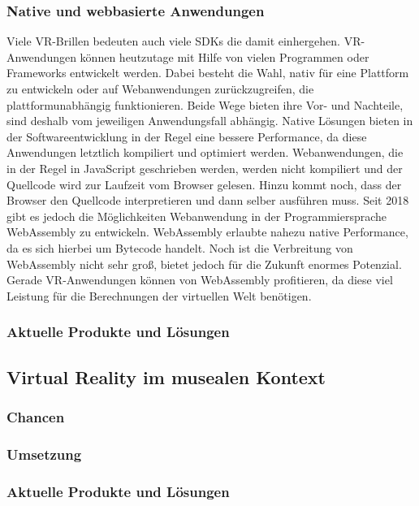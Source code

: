 \documentclass[a4paper,12pt,oneside]{article}
\begin{document}
      \subsubsection{Native und webbasierte Anwendungen}
        Viele VR-Brillen bedeuten auch viele SDKs die damit einhergehen. VR-Anwendungen
        können heutzutage mit Hilfe von vielen Programmen oder Frameworks entwickelt
        werden. Dabei besteht die Wahl, nativ für eine Plattform zu entwickeln oder auf
        Webanwendungen zurückzugreifen, die plattformunabhängig funktionieren. Beide Wege
        bieten ihre Vor- und Nachteile, sind deshalb vom jeweiligen Anwendungsfall abhängig.
        Native Lösungen bieten in der Softwareentwicklung in der Regel eine bessere 
        Performance, da diese Anwendungen letztlich kompiliert und optimiert werden.
        Webanwendungen, die in der Regel in JavaScript geschrieben werden, werden nicht 
        kompiliert und der Quellcode wird zur Laufzeit vom Browser gelesen. Hinzu kommt
        noch, dass der Browser den Quellcode interpretieren und dann selber ausführen muss.
        Seit 2018 gibt es jedoch die Möglichkeiten Webanwendung in der Programmiersprache
        WebAssembly zu entwickeln. WebAssembly erlaubte nahezu native Performance, da es
        sich hierbei um Bytecode handelt. Noch ist die Verbreitung von WebAssembly nicht
        sehr groß, bietet jedoch für die Zukunft enormes Potenzial. Gerade VR-Anwendungen
        können von WebAssembly profitieren, da diese viel Leistung für die Berechnungen
        der virtuellen Welt benötigen.
      \subsubsection{Aktuelle Produkte und Lösungen}
    \subsection{Virtual Reality im musealen Kontext}
      \subsubsection{Chancen}
      \subsubsection{Umsetzung}
      \subsubsection{Aktuelle Produkte und Lösungen}
\end{document}
